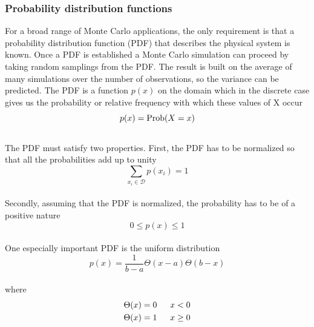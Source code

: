 \documentclass[%
reprint,
amsmath,amssymb,
aps,
]{revtex4-1}
\begin{document}
\subsubsection{Probability distribution functions}\noindent
For a broad range of Monte Carlo applications, the only requirement is that a probability distribution function (PDF) that describes the physical system is known. Once a PDF is established a Monte Carlo simulation can proceed by taking random samplings from the PDF. The result is built on the average of many simulations over the number of observations, so the variance can be predicted. The PDF is a function $p(x)$ on the domain which in the discrete case gives us the probability or relative frequency with which these values of X occur \vspace{0.5mm} \\
\begin{equation*}
	p(x) = \textnormal{Prob}(X=x)
\end{equation*}\vspace{0.5mm} \\
The PDF must satisfy two properties. First, the PDF has to be normalized so that all the probabilities add up to unity\vspace{0.5mm} \\
\begin{equation*}
	\sum_{x_i\in \mathcal{D}} p(x_i) = 1
\end{equation*} \vspace{0.5mm} \\
Secondly, assuming that the PDF is normalized, the probability has to be of a positive nature \vspace{0.5mm} \\
\begin{equation*}
	0 \leq p(x) \leq 1
\end{equation*}\vspace{0.5mm} \\
One especially important PDF is the uniform distribution\vspace{2mm} \\
\begin{equation}\label{unipdf}
	p(x) = \dfrac{1}{b-a}\Theta(x-a)\Theta(b-x)
\end{equation}\vspace{0.5mm} \\
where
\begin{align*}
	\Theta(x) &= 0& \hspace{2mm} x < 0\\
	\Theta(x) &= 1& \hspace{2mm} x \geq 0\\
\end{align*}\vspace{2mm} \\
\end{document}
